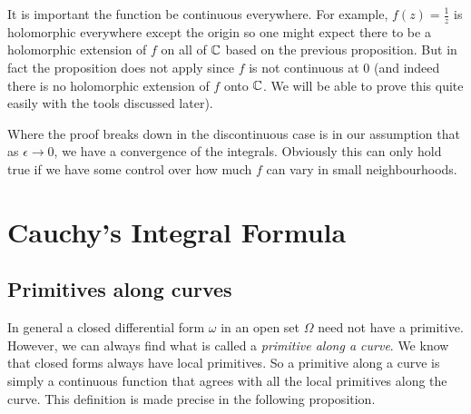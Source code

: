 \begin{remark}
    It is important the function be continuous everywhere. For example, $f(z) = \frac{1}{z}$ is holomorphic everywhere except the origin so one might expect there to be a holomorphic extension of $f$ on all of $\mathbb{C}$ based on the previous proposition. But in fact the proposition does not apply since $f$ is not continuous at 0 (and indeed there is no holomorphic extension of $f$ onto $\mathbb{C}$. We will be able to prove this quite easily with the tools discussed later). 

    Where the proof breaks down in the discontinuous case is in our assumption that as $\epsilon \to 0$, we have a convergence of the integrals. Obviously this can only hold true if we have some control over how much $f$ can vary in small neighbourhoods.
\end{remark}

\section{Cauchy's Integral Formula}

\subsection{Primitives along curves}
In general a closed differential form $\omega$ in an open set $\Omega$ need not have a primitive. However, we can always find what is called a \textit{primitive along a curve}. We know that closed forms always have local primitives. So a primitive along a curve is simply a continuous function that agrees with all the local primitives along the curve. This definition is made precise in the following proposition.

